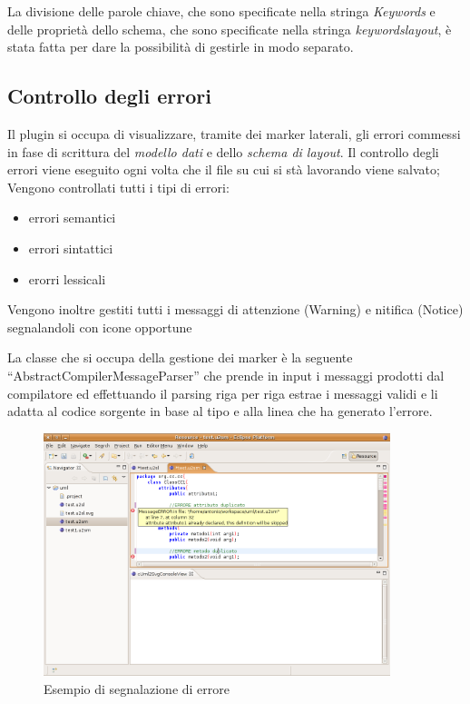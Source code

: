 La divisione delle parole chiave, che sono specificate nella stringa 
\emph{Keywords} e delle proprietà dello schema, che sono specificate nella
stringa \emph{keywordslayout},  è stata fatta per dare la possibilità 
di gestirle in modo separato.


\subsection{Controllo degli errori} 

Il plugin si occupa di visualizzare, tramite dei marker laterali, gli errori 
commessi in fase di scrittura del \emph{modello dati} e dello \emph{schema di
layout}.
Il controllo degli errori viene eseguito ogni volta che il file su cui si stà lavorando
viene salvato; 
Vengono controllati tutti i tipi di errori:
\begin{itemize}
  \item errori semantici
  \item errori sintattici
  \item erorri lessicali
\end{itemize} 

Vengono inoltre gestiti tutti i messaggi di attenzione (Warning) e nitifica
(Notice) segnalandoli con icone opportune

La classe che si occupa della gestione dei marker è la seguente
``AbstractCompilerMessageParser'' che prende in input i messaggi prodotti dal
compilatore ed effettuando il parsing riga per riga estrae i messaggi validi e
li adatta al codice sorgente in base al tipo e alla linea che ha generato l'errore.



\begin{figure}[htp]
\begin{center}
  \includegraphics[width=0.9\textwidth]{img/error}
  \caption[labelInTOC]{Esempio di segnalazione di errore}
  \label{errorieditor} 
\end{center}
\end{figure}

